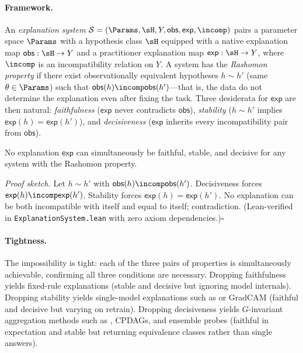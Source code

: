 
\paragraph{Framework.}
An \emph{explanation system} $\mathcal{S} = (\Params, \sH, Y, \mathsf{obs},
\mathsf{exp}, \incomp)$ pairs a parameter space $\Params$ with a hypothesis
class $\sH$ equipped with a native explanation map $\mathsf{obs}: \sH \to Y$
and a practitioner explanation map $\mathsf{exp}: \sH \to Y$, where $\incomp$
is an incompatibility relation on $Y$.
A system has the \emph{Rashomon property} if there exist observationally
equivalent hypotheses $h \sim h'$ (same $\theta \in \Params$) such that
$\mathsf{obs}(h) \incomp \mathsf{obs}(h')$---that is, the data do not
determine the explanation even after fixing the task.
Three desiderata for $\mathsf{exp}$ are then natural: \emph{faithfulness}
($\mathsf{exp}$ never contradicts $\mathsf{obs}$), \emph{stability} ($h \sim
h'$ implies $\mathsf{exp}(h) = \mathsf{exp}(h')$), and \emph{decisiveness}
($\mathsf{exp}$ inherits every incompatibility pair from $\mathsf{obs}$).

\begin{theorem}
\label{thm:universal-summary}
No explanation $\mathsf{exp}$ can simultaneously be faithful, stable, and
decisive for any system with the Rashomon property.
\end{theorem}

\noindent\emph{Proof sketch.}
Let $h \sim h'$ with $\mathsf{obs}(h) \incomp \mathsf{obs}(h')$.
Decisiveness forces $\mathsf{exp}(h) \incomp \mathsf{exp}(h')$.
Stability forces $\mathsf{exp}(h) = \mathsf{exp}(h')$.
No explanation can be both incompatible with itself and equal to itself;
contradiction.
(Lean-verified in \texttt{ExplanationSystem.lean} with zero axiom
dependencies.)\hfill$\square$

\paragraph{Tightness.}
The impossibility is tight: each of the three pairs of properties is
simultaneously achievable, confirming all three conditions are necessary.
Dropping faithfulness yields fixed-rule explanations (stable and decisive
but ignoring model internals).
Dropping stability yields single-model explanations such as \SHAP{} or
GradCAM (faithful and decisive but varying on retrain).
Dropping decisiveness yields $G$-invariant aggregation methods such as
\DASH{}, CPDAGs, and ensemble probes (faithful in expectation and stable but
returning equivalence classes rather than single answers).

